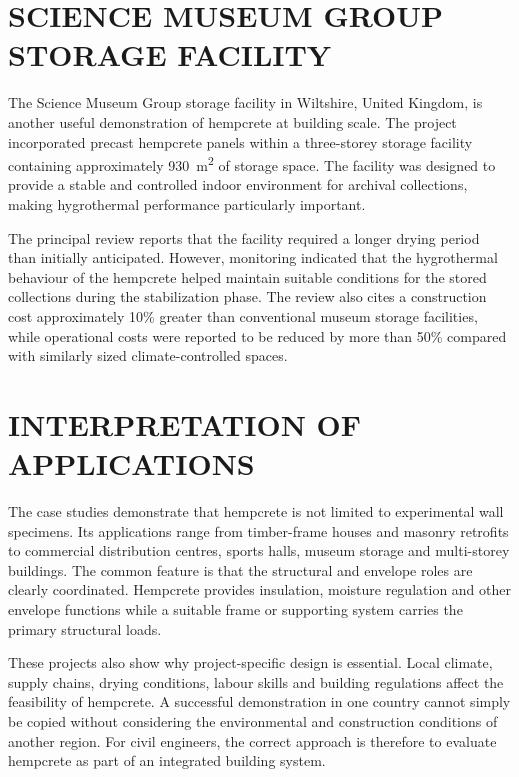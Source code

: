 \documentclass[12pt,a4paper,final]{report}
\begin{document}
\section[Science Museum Group Storage Facility]{SCIENCE MUSEUM GROUP STORAGE FACILITY}
The Science Museum Group storage facility in Wiltshire, United Kingdom, is another useful
demonstration of hempcrete at building scale. The project incorporated precast hempcrete
panels within a three-storey storage facility containing approximately 930~m\textsuperscript{2}
of storage space. The facility was designed to provide a stable and controlled indoor
environment for archival collections, making hygrothermal performance particularly important.

The principal review reports that the facility required a longer drying period than initially
anticipated. However, monitoring indicated that the hygrothermal behaviour of the hempcrete
helped maintain suitable conditions for the stored collections during the stabilization phase.
The review also cites a construction cost approximately 10\% greater than conventional
museum storage facilities, while operational costs were reported to be reduced by more than
50\% compared with similarly sized climate-controlled spaces.

\section[Interpretation of Applications]{INTERPRETATION OF APPLICATIONS}
The case studies demonstrate that hempcrete is not limited to experimental wall specimens. Its
applications range from timber-frame houses and masonry retrofits to commercial distribution
centres, sports halls, museum storage and multi-storey buildings. The common feature is that
the structural and envelope roles are clearly coordinated. Hempcrete provides insulation,
moisture regulation and other envelope functions while a suitable frame or supporting system
carries the primary structural loads.

These projects also show why project-specific design is essential. Local climate, supply chains,
drying conditions, labour skills and building regulations affect the feasibility of hempcrete. A
successful demonstration in one country cannot simply be copied without considering the
environmental and construction conditions of another region. For civil engineers, the correct
approach is therefore to evaluate hempcrete as part of an integrated building system.

\end{document}
